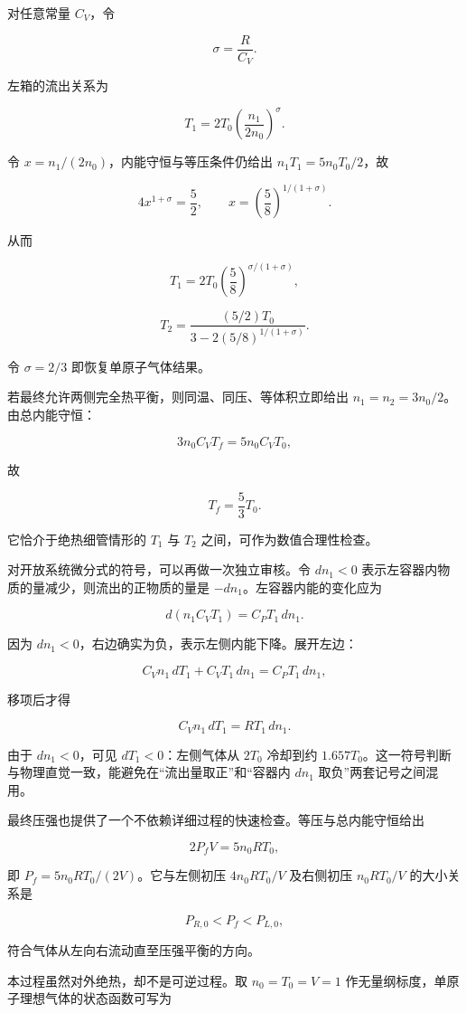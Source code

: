 \documentclass[12pt,a4paper,UTF8]{ctexart}
\begin{document}
对任意常量 \(C_V\)，令

\[
\sigma=\frac{R}{C_V}.
\]

左箱的流出关系为

\[
T_1=2T_0
\left(\frac{n_1}{2n_0}\right)^\sigma.
\]

令 \(x=n_1/(2n_0)\)，内能守恒与等压条件仍给出 \(n_1T_1=5n_0T_0/2\)，故

\[
4x^{1+\sigma}=\frac52,
\qquad
x=\left(\frac58\right)^{1/(1+\sigma)}.
\]

从而

\[
\boxed{
T_1=2T_0
\left(\frac58\right)^{\sigma/(1+\sigma)}
},
\]

\[
\boxed{
T_2=\frac{(5/2)T_0}
{3-2(5/8)^{1/(1+\sigma)}}
}.
\]

令 \(\sigma=2/3\) 即恢复单原子气体结果。

若最终允许两侧完全热平衡，则同温、同压、等体积立即给出
\(n_1=n_2=3n_0/2\)。由总内能守恒：

\[
3n_0C_VT_f=5n_0C_VT_0,
\]

故

\[
\boxed{T_f=\frac53T_0}.
\]

它恰介于绝热细管情形的 \(T_1\) 与 \(T_2\) 之间，可作为数值合理性检查。

对开放系统微分式的符号，可以再做一次独立审核。令 \(dn_1<0\)
表示左容器内物质的量减少，则流出的正物质的量是
\(-dn_1\)。左容器内能的变化应为

\[
d(n_1C_VT_1)=C_PT_1\,dn_1.
\]

因为 \(dn_1<0\)，右边确实为负，表示左侧内能下降。展开左边：

\[
C_Vn_1\,dT_1+C_VT_1\,dn_1
=C_PT_1\,dn_1,
\]

移项后才得

\[
C_Vn_1\,dT_1=RT_1\,dn_1.
\]

由于 \(dn_1<0\)，可见 \(dT_1<0\)：左侧气体从 \(2T_0\) 冷却到约
\(1.657T_0\)。这一符号判断与物理直觉一致，能避免在``流出量取正''和``容器内
\(dn_1\) 取负''两套记号之间混用。

最终压强也提供了一个不依赖详细过程的快速检查。等压与总内能守恒给出

\[
2P_fV=5n_0RT_0,
\]

即 \(P_f=5n_0RT_0/(2V)\)。它与左侧初压 \(4n_0RT_0/V\) 及右侧初压
\(n_0RT_0/V\) 的大小关系是

\[
P_{R,0}<P_f<P_{L,0},
\]

符合气体从左向右流动直至压强平衡的方向。

本过程虽然对外绝热，却不是可逆过程。取 \(n_0=T_0=V=1\)
作无量纲标度，单原子理想气体的状态函数可写为
\end{document}

